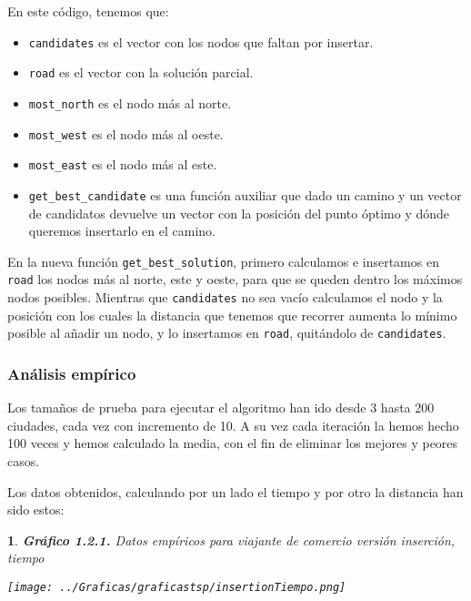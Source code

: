 \documentclass[10pt, a4paper]{article}
\theoremstyle{theorem-style}
\newtheorem*{datos}{}
\theoremstyle{theorem-style}
\theoremstyle{definition-style}
\theoremstyle{remark-style}
\theoremstyle{example-style}
\theoremstyle{definition-style}
\theoremstyle{remark-style}
\begin{document}
En este código, tenemos que:
\begin{itemize}
	\item \texttt{candidates} es el vector con los nodos que faltan por insertar. 
	\item \texttt{road} es el vector con la solución parcial. 
	\item \texttt{most\_north} es el nodo más al norte.
	\item \texttt{most\_west} es el nodo más al oeste.
	\item \texttt{most\_east} es el nodo más al este.
	\item \texttt{get\_best\_candidate} es una función auxiliar que dado un camino y un vector de candidatos devuelve un vector con la posición del punto óptimo y dónde queremos insertarlo en el camino. 
\end{itemize}

En la nueva función \texttt{get\_best\_solution}, primero calculamos e insertamos en \texttt{road} los nodos más al norte, este y oeste, para que se queden dentro los máximos nodos posibles. Mientras que \texttt{candidates} no sea vacío calculamos el nodo y la posición con los cuales la distancia que tenemos que recorrer aumenta lo mínimo posible al añadir un nodo, y lo insertamos en \texttt{road}, quitándolo de \texttt{candidates}.

\subsubsection*{Análisis empírico}

Los tamaños de prueba para ejecutar el algoritmo han ido desde 3 hasta 200 ciudades, cada vez con incremento de 10. A su vez cada iteración la hemos hecho 100 veces y hemos calculado la media, con el fin de eliminar los mejores y peores casos.  

Los datos obtenidos, calculando por un lado el tiempo y por otro la distancia han sido estos:

\begin{datos}
	{\bf\sffamily Gráfico 1.2.1.} {\sffamily Datos empíricos para viajante de comercio versión inserción, tiempo}\\
	\vspace{-0.7cm}
	\begin{center}
		\texttt{[image: ../Graficas/graficastsp/insertionTiempo.png]}
	\end{center}	
\end{datos}

\pagebreak
\end{document}
